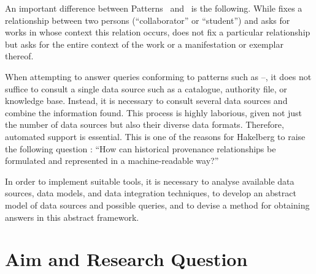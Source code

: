 An important difference between Patterns~ and~ is the following.
While  fixes a relationship between two persons (\enquote{collaborator} or \enquote{student})
and asks for works in whose context this relation occurs,
 does not fix a particular relationship but asks for the entire context of
the work or a manifestation or exemplar thereof.

When attempting to answer queries conforming to patterns such as --,
it does not suffice to consult a single data source such as
a catalogue, authority file, or knowledge base.
Instead, it is necessary to consult several data sources
and combine the information found. This process is highly laborious,
given not just the number of data sources but also their diverse
data formats. Therefore, automated support is essential.
This is one of the reasons for Hakelberg
to raise the following question \autocite[p.\,46, translated from German]{Hakelberg2016}:
\enquote{How can historical provenance relationships be formulated and represented
in a machine-readable way?}

In order to implement suitable tools,
it is necessary to analyse available data sources, data models, and data integration techniques,
to develop an abstract model of data sources and possible queries,
and to devise a method for obtaining answers in this abstract framework.


\section{Aim and Research Question}
\label{sec:research_questions}

